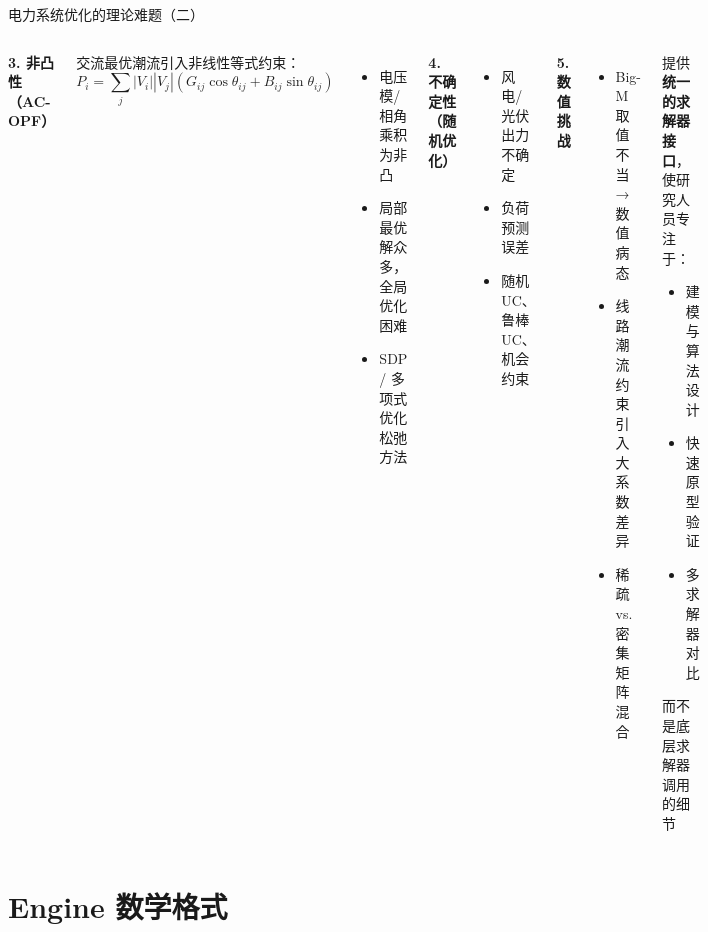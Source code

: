\documentclass[10pt,aspectratio=169]{beamer}
\begin{document}
\begin{frame}{电力系统优化的理论难题（二）}
  \begin{columns}[T]
    \textbf{3. 非凸性（AC-OPF）}

    交流最优潮流引入非线性等式约束：
    \[
      P_i = \sum_j |V_i||V_j|\left(G_{ij}\cos\theta_{ij} + B_{ij}\sin\theta_{ij}\right)
    \]
    \begin{itemize}
      \item 电压模/相角乘积为非凸
      \item 局部最优解众多，全局优化困难
      \item SDP / 多项式优化松弛方法
    \end{itemize}

    \vspace{6pt}
    \textbf{4. 不确定性（随机优化）}
    \begin{itemize}
      \item 风电/光伏出力不确定
      \item 负荷预测误差
      \item 随机 UC、鲁棒 UC、机会约束
    \end{itemize}

    \textbf{5. 数值挑战}
    \begin{itemize}
      \item Big-M 取值不当→数值病态
      \item 线路潮流约束引入大系数差异
      \item 稀疏 vs. 密集矩阵混合
    \end{itemize}

    \vspace{10pt}
    \begin{tcolorbox}[mybox,title=MIPSolvers 目标]
      \footnotesize
      提供\textbf{统一的求解器接口}，使研究人员专注于：
      \begin{itemize}
        \item 建模与算法设计
        \item 快速原型验证
        \item 多求解器对比
      \end{itemize}
      而不是底层求解器调用的细节
    \end{tcolorbox}
  \end{columns}
\end{frame}

\section{Engine 数学格式}
\end{document}
